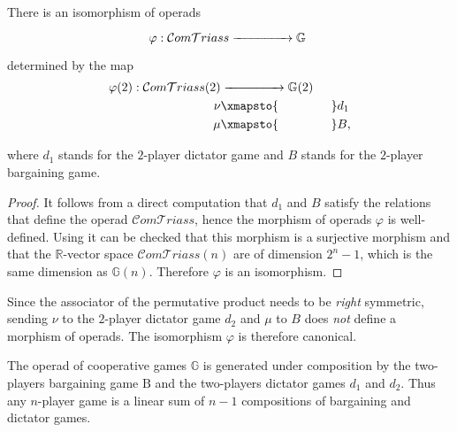 \documentclass[a4paper,12pt]{amsart}
\begin{document}
\begin{theorem}\label{thm: iso comtriass et operade}
There is an isomorphism of operads 
\[
\begin{tikzcd}
\varphi: \mathcal{C}om\mathcal{T}riass \xrightarrow{\hspace{1.5cm}} \mathbb{G}~
\end{tikzcd}
\]
determined by the map 
\[ \begin{aligned} 
\varphi(2) : \mathcal{C}om\mathcal{T}riass(2) & \xrightarrow{\hspace{1.5cm}} \mathbb{G}(2) \\
\nu & \xmapsto{\hspace{1.5cm}} d_1 \\
\mu & \xmapsto{\hspace{1.5cm}} B, 
\end{aligned} \]

where $d_1$ stands for the $2$-player dictator game and $B$ stands for the $2$-player bargaining game.
\end{theorem}

\begin{proof}
It follows from a direct computation that $d_1$ and $B$ satisfy the relations that define the operad $\mathcal{C}om\mathcal{T}riass$, hence the morphism of operads $\varphi$ is well-defined. Using \cite[Theorem 14]{Vallettepartition} it can be checked that this morphism is a surjective morphism and that the $\mathbb{R}$-vector space $\mathcal{C}om\mathcal{T}riass(n)$ are of dimension $2^n-1$, which is the same dimension as $\mathbb{G}(n)$. Therefore $\varphi$ is an isomorphism. 
\end{proof}

\begin{remark}
Since the associator of the permutative product needs to be \textit{right} symmetric, sending $\nu$ to the $2$-player dictator game $d_2$ and $\mu$ to $B$ does \textit{not} define a morphism of operads. The isomorphism $\varphi$ is therefore canonical.
\end{remark}

\begin{corollary}\label{cor: generators of the operad of cooperative games}
The operad of cooperative games $\mathbb{G}$ is generated under composition by the two-players bargaining game $\mathrm{B}$ and the two-players dictator games $d_1$ and $d_2$. Thus any $n$-player game is a linear sum of $n-1$ compositions of bargaining and dictator games. 
\end{corollary}
\end{document}
